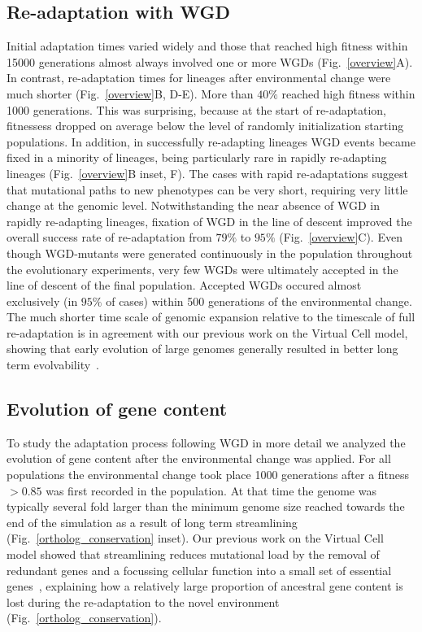 \subsection{Re-adaptation with WGD}
Initial adaptation times varied widely and those that reached high fitness within 15000 generations almost always involved one or more WGDs (Fig.~\ref{overview}A). In contrast, re-adaptation times for  lineages  after environmental change were much shorter (Fig.~\ref{overview}B, D-E). More than $40\%$ reached high fitness within 1000 generations. This was surprising, because at the start of re-adaptation, fitnessess dropped on average below the level of randomly initialization starting populations. In addition, in  successfully re-adapting lineages  WGD events became fixed in a minority of lineages, being particularly rare in rapidly re-adapting lineages (Fig.~\ref{overview}B inset, F). The cases with rapid re-adaptations suggest that mutational paths to new phenotypes can be very short, requiring very little change at the genomic level. Notwithstanding the near absence of WGD in rapidly re-adapting lineages, fixation of WGD in the line of descent improved the overall success rate of re-adaptation from $79\%$ to $95\%$ (Fig.~\ref{overview}C). Even though WGD-mutants were generated continuously in the population throughout the evolutionary experiments, very few WGDs were ultimately accepted in the line of descent of the final population. Accepted WGDs occured almost exclusively (in $95\%$ of cases) within 500 generations of the environmental change. The much shorter time scale of genomic expansion relative to the timescale of full re-adaptation is in agreement with our previous work on the Virtual Cell model, showing that early evolution of large genomes generally resulted in better long term evolvability~\cite{cuypers_virtual_2012}.

\subsection{Evolution of gene content}
To study the adaptation process following WGD in more detail we analyzed the evolution of gene content after the environmental change was applied. For all populations the environmental change took place 1000 generations after a fitness $>0.85$ was first recorded in the population. At that time the genome was typically several fold larger than the minimum genome size reached towards the end of the simulation as a result of long term streamlining (Fig.~\ref{ortholog_conservation} inset). Our previous work on the Virtual Cell model showed that streamlining reduces mutational load by the removal of redundant genes and a focussing cellular function into a small set of essential genes~\cite{cuypers_virtual_2012}, explaining how a relatively large proportion of ancestral gene content is lost during the re-adaptation to the novel environment (Fig.~\ref{ortholog_conservation}). 

